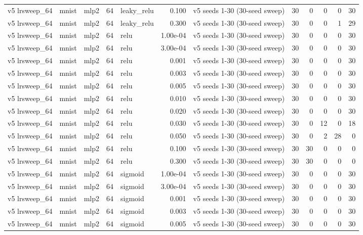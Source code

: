 \begin{table}[htbp]
{\begin{tabular}{@{}lllrlrlrrrrr@{}}
v5 lrsweep\_64 & mnist & mlp2 & 64 & leaky\_relu & 0.100 & v5 seeds 1-30 (30-seed sweep) & 30 & 0 & 0 & 0 & 30 \\
v5 lrsweep\_64 & mnist & mlp2 & 64 & leaky\_relu & 0.300 & v5 seeds 1-30 (30-seed sweep) & 30 & 0 & 0 & 1 & 29 \\
v5 lrsweep\_64 & mnist & mlp2 & 64 & relu & 1.00e-04 & v5 seeds 1-30 (30-seed sweep) & 30 & 0 & 0 & 0 & 30 \\
v5 lrsweep\_64 & mnist & mlp2 & 64 & relu & 3.00e-04 & v5 seeds 1-30 (30-seed sweep) & 30 & 0 & 0 & 0 & 30 \\
v5 lrsweep\_64 & mnist & mlp2 & 64 & relu & 0.001 & v5 seeds 1-30 (30-seed sweep) & 30 & 0 & 0 & 0 & 30 \\
v5 lrsweep\_64 & mnist & mlp2 & 64 & relu & 0.003 & v5 seeds 1-30 (30-seed sweep) & 30 & 0 & 0 & 0 & 30 \\
v5 lrsweep\_64 & mnist & mlp2 & 64 & relu & 0.005 & v5 seeds 1-30 (30-seed sweep) & 30 & 0 & 0 & 0 & 30 \\
v5 lrsweep\_64 & mnist & mlp2 & 64 & relu & 0.010 & v5 seeds 1-30 (30-seed sweep) & 30 & 0 & 0 & 0 & 30 \\
v5 lrsweep\_64 & mnist & mlp2 & 64 & relu & 0.020 & v5 seeds 1-30 (30-seed sweep) & 30 & 0 & 0 & 0 & 30 \\
v5 lrsweep\_64 & mnist & mlp2 & 64 & relu & 0.030 & v5 seeds 1-30 (30-seed sweep) & 30 & 0 & 12 & 0 & 18 \\
v5 lrsweep\_64 & mnist & mlp2 & 64 & relu & 0.050 & v5 seeds 1-30 (30-seed sweep) & 30 & 0 & 2 & 28 & 0 \\
v5 lrsweep\_64 & mnist & mlp2 & 64 & relu & 0.100 & v5 seeds 1-30 (30-seed sweep) & 30 & 30 & 0 & 0 & 0 \\
v5 lrsweep\_64 & mnist & mlp2 & 64 & relu & 0.300 & v5 seeds 1-30 (30-seed sweep) & 30 & 30 & 0 & 0 & 0 \\
v5 lrsweep\_64 & mnist & mlp2 & 64 & sigmoid & 1.00e-04 & v5 seeds 1-30 (30-seed sweep) & 30 & 0 & 0 & 0 & 30 \\
v5 lrsweep\_64 & mnist & mlp2 & 64 & sigmoid & 3.00e-04 & v5 seeds 1-30 (30-seed sweep) & 30 & 0 & 0 & 0 & 30 \\
v5 lrsweep\_64 & mnist & mlp2 & 64 & sigmoid & 0.001 & v5 seeds 1-30 (30-seed sweep) & 30 & 0 & 0 & 0 & 30 \\
v5 lrsweep\_64 & mnist & mlp2 & 64 & sigmoid & 0.003 & v5 seeds 1-30 (30-seed sweep) & 30 & 0 & 0 & 0 & 30 \\
v5 lrsweep\_64 & mnist & mlp2 & 64 & sigmoid & 0.005 & v5 seeds 1-30 (30-seed sweep) & 30 & 0 & 0 & 0 & 30 \\

\end{tabular}}
\end{table}
